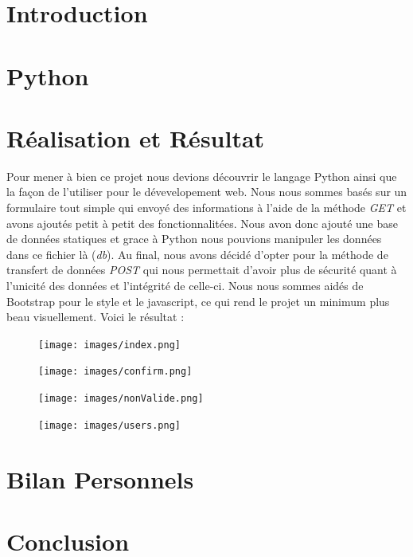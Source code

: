 \documentclass[12pt]{article}
\begin{document}
\tableofcontents
{}
\pagebreak


\section{Introduction}
\section{Python}
\section{Réalisation et Résultat}
Pour mener à bien ce projet nous devions découvrir le langage Python ainsi que la façon de l'utiliser pour le dévevelopement web. Nous nous sommes basés sur un formulaire tout simple qui envoyé des informations à l'aide de la méthode \textit{GET} et avons ajoutés petit à petit des fonctionnalitées. Nous avon donc ajouté une base de données statiques et grace à Python nous pouvions manipuler les données dans ce fichier là (\textit{db}). Au final, nous avons décidé d'opter pour la méthode de transfert de données \textit{POST} qui nous permettait d'avoir plus de sécurité quant à l'unicité des données et l'intégrité de celle-ci. Nous nous sommes aidés de Bootstrap pour le style et le javascript, ce qui rend le projet un minimum plus beau visuellement. \br
Voici le résultat :
\begin{figure}[H]
\texttt{[image: images/index.png]}
\centering
\end{figure}
\begin{figure}[H]
\texttt{[image: images/confirm.png]}
\centering
\end{figure}
\begin{figure}[H]
\texttt{[image: images/nonValide.png]}
\centering
\end{figure}
\begin{figure}[H]
\texttt{[image: images/users.png]}
\centering
\end{figure}
\section{Bilan Personnels}
\section{Conclusion}
\end{document}
